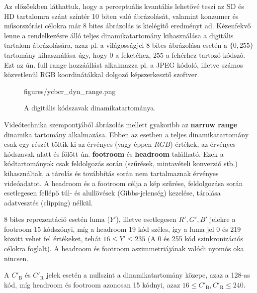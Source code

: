 Az előzőekben láthattuk, hogy a perceptuális kvantálás lehetővé teszi az SD és HD tartalomra szánt színtér 10 biten való ábrázolását, valamint konzumer és műsorszórási célokra már 8 bites ábrázolás is kielégítő eredményt ad.
Kézenfekvő lenne a rendelkezésre álló teljes dinamikatartomány kihasználása a digitális tartalom ábrázolására, azaz pl. a világosságjel 8 bites ábrázolása esetén a $\lbrace 0, 255 \rbrace$ tartomány kihasználása úgy, hogy 0 a feketéhez, 255 a fehérhez tartozó kódszó.
Ezt az ún. full range hozzáállást alkalmazza pl. a JPEG kódoló, illetve számos közvetlenül RGB koordinátákkal dolgozó képszerkesztő szoftver.

\begin{figure}[]
	\centering
	\begin{overpic}[width = 0.7\columnwidth ]{figures/ycbcr_dyn_range.png}
	\end{overpic}
	\caption{A digitális \ycbcr kódszavak dinamikatartománya.}
	\label{Fig:ycbcr_dyn_range}
\end{figure}
Videótechnika szempontjából \ycbcr ábrázolás mellett gyakoribb az \textbf{narrow range} dinamika tartomány alkalmazása.
Ebben az esetben a teljes dinamikatartomány csak egy részét töltik ki az érvényes \ycbcr (vagy éppen $RGB$) értékek, az érvényes kódszavak alatt és fölött ún. \textbf{footroom} és \textbf{headroom} található.
Ezek a kódtartományok csak feldolgozás során (szűrések, mintavételi konverzió stb.) kihasználtak, a tárolás és továbbítás során nem tartalmaznak érvényes videóadatot.
A headroom és a footroom célja a kép szűrése, feldolgozása során esetlegesen fellépő túl- és alullövések (Gibbs-jelenség) kezelése, tárolása adatvesztés (clipping) nélkül.

8 bites reprezentáció esetén luma ($Y'$), illetve esetlegesen $R',G',B'$ jelekre a footroom 15 kódszónyi, míg a headroom 19 kód széles, így a luma jel 0 és 219 között vehet fel értékeket, tehát $16 \leq Y' \leq 235$ (A 0 és 255 kód szinkronizációs célokra foglalt).
A headroom és footroom aszimmetriájának valódi nyomós oka nincsen.

A $C'_\mathrm{B}$ és $C'_\mathrm{R}$ jelek esetén a nullszint a dinamikatartomány közepe, azaz a 128-as kód, míg headroom és footroom azonosan 15 kódnyi, azaz $16 \leq C'_\mathrm{B}, C'_\mathrm{R} \leq 240$.

